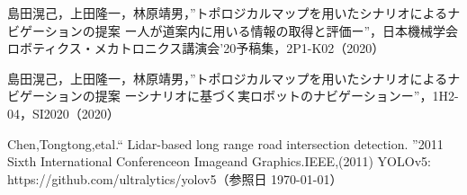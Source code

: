 \documentclass[10pt]{jarticle}
\begin{document}
    \vspace{5truemm}
    {\footnotesize
        \begin{thebibliography}{5}
            
             島田滉己，上田隆一，林原靖男，”トポロジカルマップを用いたシナリオによるナビゲーションの提案 ー人が道案内に用いる情報の取得と評価ー”，日本機械学会ロボティクス・メカトロニクス講演会'20予稿集，2P1-K02（2020）
            
             島田滉己，上田隆一，林原靖男，”トポロジカルマップを用いたシナリオによるナビゲーションの提案 ーシナリオに基づく実ロボットのナビゲーションー”，1H2-04，SI2020（2020）

             Chen,Tongtong,etal.“ Lidar-based long range road intersection detection. ”2011 Sixth International Conferenceon Imageand Graphics.IEEE,(2011)
             YOLOv5: https://github.com/ultralytics/yolov5（参照日 \today）
            
        \end{thebibliography}
    }
    \normalsize
    
\end{document}
